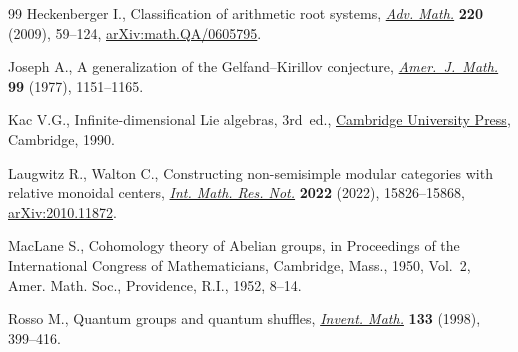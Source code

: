 \begin{thebibliography}{99}
Heckenberger I., Classification of arithmetic root systems, \href{https://doi.org/10.1016/j.aim.2008.08.005}{\textit{Adv. Math.}}
 \textbf{220} (2009), 59--124, \href{https://arxiv.org/abs/math.QA/0605795}{arXiv:math.QA/0605795}.

Joseph A., A generalization of the {G}elfand--{K}irillov conjecture,
 \href{https://doi.org/10.2307/2374020}{\textit{Amer.~J.~Math.}} \textbf{99} (1977), 1151--1165.

Kac V.G., Infinite-dimensional {L}ie algebras, 3rd~ed., \href{https://doi.org/10.1017/CBO9780511626234}{Cambridge University
 Press}, Cambridge, 1990.

Laugwitz R., Walton C., Constructing non-semisimple modular categories with
 relative monoidal centers, \href{https://doi.org/10.1093/imrn/rnab097}{\textit{Int. Math. Res. Not.}} \textbf{2022}
 (2022), 15826--15868, \href{https://arxiv.org/abs/2010.11872}{arXiv:2010.11872}.

MacLane S., Cohomology theory of {A}belian groups, in Proceedings of the
 {I}nternational {C}ongress of {M}athematicians, {C}ambridge, {M}ass., 1950,
 Vol.~2, Amer. Math. Soc., Providence, R.I., 1952, 8--14.

Rosso M., Quantum groups and quantum shuffles, \href{https://doi.org/10.1007/s002220050249}{\textit{Invent. Math.}}
 \textbf{133} (1998), 399--416.

\end{thebibliography}
